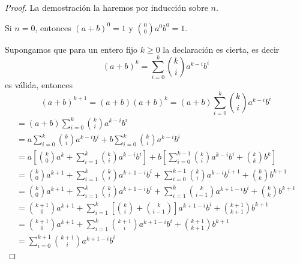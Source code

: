\begin{proof}
    La demostración la haremos por inducción sobre $n$.

    Si $n = 0$, entonces $(a + b)^0 = 1$ y $\binom{0}{0}a^0 b^0 = 1$.

    Supongamos que para un entero fijo $k \geq 0$ la declaración es cierta, es decir
    \[(a + b)^k = \sum\limits_{i = 0}^{k} \binom{k}{i}a^{k - i}b^i\]
    es válida, entonces
    \[(a + b)^{k + 1} = (a + b)(a + b)^k = (a + b) \sum\limits_{i = 0}^{k} \binom{k}{i}a^{k - i}b^i\]
    \begin{gather*}
        = (a + b) \sum\limits_{i = 0}^{k} \binom{k}{i}a^{k - i}b^i\\
        = a\sum\limits_{i = 0}^{k} \binom{k}{i}a^{k - i}b^i + b\sum\limits_{i = 0}^{k} \binom{k}{i}a^{k - i}b^i\\
        = a\left[\binom{k}{0}a^{k} + \sum\limits_{i = 1}^{k} \binom{k}{i}a^{k - i}b^i\right] + b\left[\sum\limits_{i = 0}^{k - 1} \binom{k}{i}a^{k - i}b^i + \binom{k}{k}b^k\right]\\
        = \binom{k}{0}a^{k + 1} + \sum\limits_{i = 1}^{k} \binom{k}{i}a^{k + 1 - i}b^i+ \sum\limits_{i = 0}^{k - 1} \binom{k}{i}a^{k - i}b^{i + 1} + \binom{k}{k}b^{k + 1} \\
        = \binom{k}{0}a^{k + 1} + \sum\limits_{i = 1}^{k} \binom{k}{i}a^{k + 1 - i}b^i+ \sum\limits_{i = 1}^{k} \binom{k}{i - 1}a^{k + 1 - i}b^{i} + \binom{k}{k}b^{k + 1} \\
        = \binom{k + 1}{0}a^{k + 1} + \sum\limits_{i = 1}^{k} \left[ \binom{k}{i} + \binom{k}{i - 1}\right] a^{k + 1 - i}b^i + \binom{k + 1}{k + 1}b^{k + 1} \\
        = \binom{k + 1}{0}a^{k + 1} + \sum\limits_{i = 1}^{k} \binom{k + 1}{i} a^{k + 1 - i}b^i + \binom{k + 1}{k + 1}b^{k + 1} \\
        = \boxed{\sum\limits_{i = 0}^{k + 1} \binom{k + 1}{i} a^{k + 1 - i}b^i}
    \end{gather*}

\end{proof}




